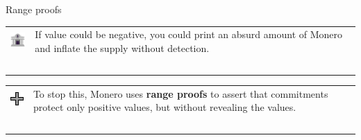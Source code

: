 \documentclass[aspectratio=169]{beamer}
\begin{document}
\begin{frame}{Range proofs}
    \begin{tabular}{>{\arraybackslash}m{40px} >{\arraybackslash}m{320px}}
        \includegraphics[width=30px]{images/bank.png} & If value could be negative, you could print an absurd amount of Monero and inflate the supply without detection. \\~\\
    \end{tabular}

    \begin{tabular}{>{\arraybackslash}m{40px} >{\arraybackslash}m{320px}}
        \includegraphics[width=30px]{images/plus.png} & To stop this, Monero uses \textbf{range proofs} to assert that commitments protect only positive values, but without revealing the values. \\~\\
    \end{tabular}

    \begin{figure}
    \end{figure}
\end{frame}
\end{document}

